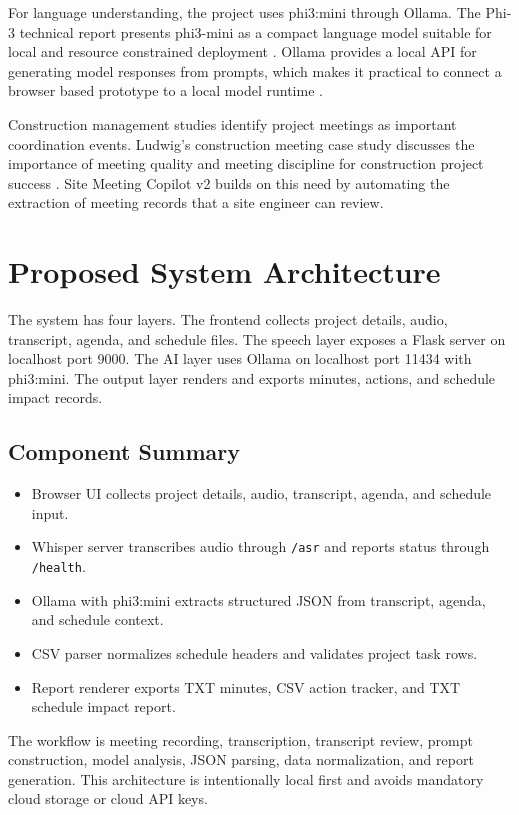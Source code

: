 \documentclass[conference]{IEEEtran}
\begin{document}
For language understanding, the project uses phi3:mini through Ollama. The Phi-3 technical report presents phi3-mini as a compact language model suitable for local and resource constrained deployment \cite{abdin2024phi3}. Ollama provides a local API for generating model responses from prompts, which makes it practical to connect a browser based prototype to a local model runtime \cite{ollamaapi}.

Construction management studies identify project meetings as important coordination events. Ludwig's construction meeting case study discusses the importance of meeting quality and meeting discipline for construction project success \cite{ludwig2018meetings}. Site Meeting Copilot v2 builds on this need by automating the extraction of meeting records that a site engineer can review.

\section{Proposed System Architecture}
The system has four layers. The frontend collects project details, audio, transcript, agenda, and schedule files. The speech layer exposes a Flask server on localhost port 9000. The AI layer uses Ollama on localhost port 11434 with phi3:mini. The output layer renders and exports minutes, actions, and schedule impact records.

\subsection{Component Summary}
\begin{itemize}
    \item Browser UI collects project details, audio, transcript, agenda, and schedule input.
    \item Whisper server transcribes audio through \texttt{/asr} and reports status through \texttt{/health}.
    \item Ollama with phi3:mini extracts structured JSON from transcript, agenda, and schedule context.
    \item CSV parser normalizes schedule headers and validates project task rows.
    \item Report renderer exports TXT minutes, CSV action tracker, and TXT schedule impact report.
\end{itemize}

The workflow is meeting recording, transcription, transcript review, prompt construction, model analysis, JSON parsing, data normalization, and report generation. This architecture is intentionally local first and avoids mandatory cloud storage or cloud API keys.
\end{document}
